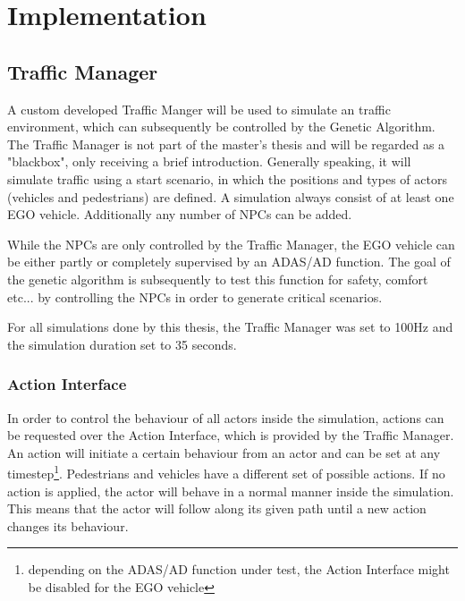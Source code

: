 \chapter{Implementation}
\label{chap:implementation}
\section{Traffic Manager}
A custom developed Traffic Manger will be used to simulate an traffic environment, which can subsequently be controlled by the Genetic Algorithm. The Traffic Manager is not part of the master's thesis and will be regarded as a "blackbox", only receiving a brief introduction.
Generally speaking, it will simulate traffic using a start scenario, in which the positions and types of actors (vehicles and pedestrians) are defined. 
A simulation always consist of at least one EGO vehicle. Additionally any number of NPCs can be added.

While the NPCs are only controlled by the Traffic Manager, the EGO vehicle can be either partly or completely supervised by an ADAS/AD function. The goal of the genetic algorithm is subsequently to test this function for safety, comfort etc... by controlling the NPCs in order to generate critical scenarios.

For all simulations done by this thesis, the Traffic Manager was set to 100Hz and the simulation duration set to 35 seconds.

\subsection{Action Interface}
\label{implementation:action_interface}
In order to control the behaviour of all actors inside the simulation, actions can be requested over the Action Interface, which is provided by the Traffic Manager. An action will initiate a certain behaviour from an actor and can be set at any timestep\footnote{depending on the ADAS/AD function under test, the Action Interface might be disabled for the EGO vehicle}. Pedestrians and vehicles have a different set of possible actions. If no action is applied, the actor will behave in a normal manner inside the simulation. This means that the actor will follow along its given path until a new action changes its behaviour.

